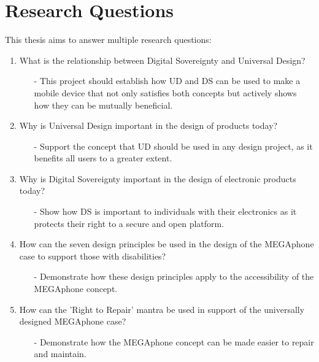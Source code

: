 \section{Research Questions}

This thesis aims to answer multiple research questions:

\begin{enumerate}
    \item What is the relationship between Digital Sovereignty and Universal Design? %
        \begin{enumerate}
        \item[-] This project should establish how UD and DS can be used to make a mobile device that not only satisfies both concepts but actively shows how they can be mutually beneficial.
        \end{enumerate} 
    \item Why is Universal Design important in the design of products today?
        \begin{enumerate}
        \item[-] Support the concept that UD should be used in any design project, as it benefits all users to a greater extent.
        \end{enumerate}
    \item Why is Digital Sovereignty important in the design of electronic products today?
        \begin{enumerate}
        \item[-] Show how DS is important to individuals with their electronics as it protects their right to a secure and open platform.
        \end{enumerate} 
    \item How can the seven design principles be used in the design of the MEGAphone case to support those with disabilities?
        \begin{enumerate}
        \item[-] Demonstrate how these design principles apply to the accessibility of the MEGAphone concept.
        \end{enumerate} 
    \item How can the 'Right to Repair' mantra be used in support of the universally designed MEGAphone case?
        \begin{enumerate}
        \item[-] Demonstrate how the MEGAphone concept can be made easier to repair and maintain.

\end{enumerate}
\end{enumerate}
